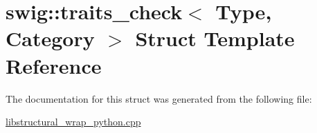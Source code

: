 \hypertarget{structswig_1_1traits__check}{}\section{swig\+:\+:traits\+\_\+check$<$ Type, Category $>$ Struct Template Reference}
\label{structswig_1_1traits__check}


The documentation for this struct was generated from the following file\+:\begin{DoxyCompactItemize}
\item 
\hyperlink{libstructural__wrap__python_8cpp}{libstructural\+\_\+wrap\+\_\+python.\+cpp}\end{DoxyCompactItemize}
